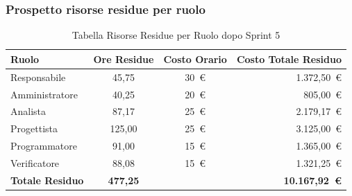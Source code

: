 \subsubsection{Prospetto risorse residue per ruolo}
\begin{table}[H]
    \centering
    \renewcommand{\arraystretch}{1.3}
    \begin{tabularx}{\textwidth}{|X|c|c|r|}
        \hline
        \textbf{Ruolo} & \textbf{Ore Residue} & \textbf{Costo Orario} & \textbf{Costo Totale Residuo} \\
        \hline
        Responsabile   & 45,75  & 30~\euro & 1.372{,}50~\euro \\
        Amministratore & 40,25  & 20~\euro &   805{,}00~\euro \\
        Analista       & 87,17  & 25~\euro & 2.179{,}17~\euro \\
        Progettista    & 125,00 & 25~\euro & 3.125{,}00~\euro \\
        Programmatore  & 91,00  & 15~\euro & 1.365{,}00~\euro \\
        Verificatore   & 88,08  & 15~\euro & 1.321{,}25~\euro \\
        \hline
        \textbf{Totale Residuo} & \textbf{477,25} & & \textbf{10.167{,}92~\euro} \\
        \hline
    \end{tabularx}
    \caption{Tabella Risorse Residue per Ruolo dopo Sprint 5}
\end{table}

